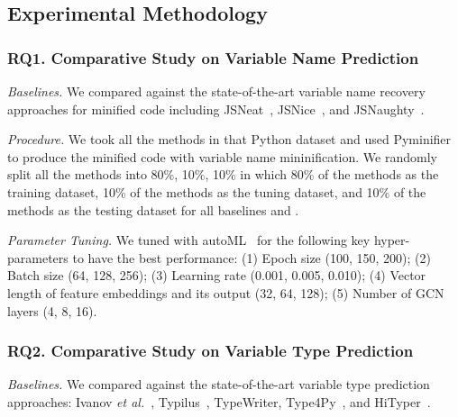 \subsection{Experimental Methodology}
\label{empirical-method}

\subsubsection{RQ1. Comparative Study on Variable Name Prediction\\}
{\em Baselines.} We compared {\tool} against the state-of-the-art
variable name recovery approaches for minified code including
JSNeat~\cite{icse19}, JSNice~\cite{JSNice2015}, and
JSNaughty~\cite{JSNaughty2017}.

\textit{Procedure.} We took all the methods in that Python dataset
and used Pyminifier to produce the minified code with variable name
mininification. We randomly split all the methods into 80\%, 10\%,
10\% in which 80\% of the methods as the training dataset, 10\% of the
methods as the tuning dataset, and 10\% of the methods as the testing
dataset for all baselines and {\tool}.


{\em Parameter Tuning.} We tuned {\tool} with autoML~\cite{NNI} for
the following key hyper-parameters to have the best performance: (1)
Epoch size (100, 150, 200); (2) Batch size (64, 128, 256); (3)
Learning rate (0.001, 0.005, 0.010); (4) Vector length of feature
embeddings and its output (32, 64, 128); (5) Number of GCN layers (4,
8, 16).

\subsubsection{RQ2. Comparative Study on Variable Type Prediction\\}

{\em Baselines.} We compared {\tool} against the state-of-the-art
  variable type prediction approaches: Ivanov {\em et
  al.}~\cite{ivanov21predicting}, Typilus~\cite{typilus-pldi20},
  TypeWriter\cite{typewriter-fse20}, Type4Py~\cite{Type4Py-icse22},
  and HiTyper~\cite{HiTyper-icse22}.

